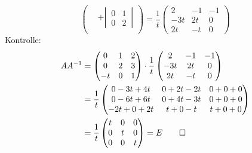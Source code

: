 \begin{loesung}
\[\begin{pmatrix}
&+\left|\,\begin{matrix} 0&1\\0&2\end{matrix}\,\right|\\
\end{pmatrix}
=
\frac1t
\begin{pmatrix}
 2 &-1 &-1\\
-3t& 2t& 0\\
 2t& -t& 0
\end{pmatrix}
\]
Kontrolle:
\begin{align*}
AA^{-1}
&=
\begin{pmatrix}
 0& 1& 2\\
 0& 2& 3\\
-t& 0& 1
\end{pmatrix}
\cdot
\frac1t
\begin{pmatrix}
 2 &-1 &-1\\
-3t& 2t& 0\\
 2t& -t& 0
\end{pmatrix}
\\
&=
\frac1t
\begin{pmatrix}
0-3t+4t&0+2t-2t&0+0+0\\
0-6t+6t&0+4t-3t&0+0+0\\
-2t+0+2t&t+0-t&t+0+0
\end{pmatrix}
\\
&=\frac1t\begin{pmatrix}t&0&0\\0&t&0\\0&0&t\end{pmatrix}=E
\qedhere
\end{align*}
\end{loesung}

